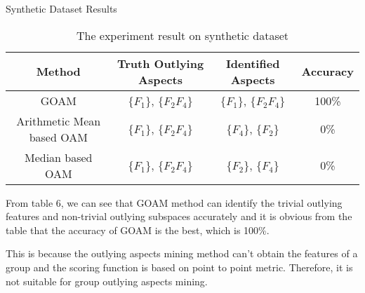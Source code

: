 \documentclass[
 size=14pt,
 paper=smartboard,  %
 mode=present, 		%
 display=slides, 	%
 style=tuliplab,  	%
 pauseslide,
 fleqn,leqno]{powerdot}
\begin{document}
\begin{slide}[toc=,bm=]{Synthetic Dataset Results}

\begin{table}[tb]
\setlength{\abovecaptionskip}{0pt}
\setlength{\belowcaptionskip}{10pt}
\centering
\caption{The experiment result on synthetic dataset}

\begin{tabular}{ c | c | c | c }
\toprule
  Method     &  Truth Outlying Aspects    & Identified Aspects & Accuracy      \\
\midrule
  GOAM       &  $\{F_1\}$, $\{F_2F_4\}$   &  $\{F_1\}$, $\{F_2F_4\}$    & 100\%    \\

Arithmetic Mean based OAM &  $\{F_1\}$, $\{F_2F_4\}$   &  $\{F_4\}$, $\{F_2\}$    &  0\% \\

Median based OAM &  $\{F_1\}$, $\{F_2F_4\}$   &  $\{F_2\}$, $\{F_4\}$    &           0\% \\
\bottomrule
\end{tabular}
\end{table}

\begin{note}
From table $6$,
we can see that GOAM method can identify the trivial outlying features
and non-trivial outlying subspaces accurately and
it is obvious from the table that the accuracy of GOAM is the best,
which is 100\%.

This is because the outlying aspects mining method
can't obtain the features of a group and the scoring function
is based on point to point metric.
Therefore,
it is not suitable for group outlying aspects mining.
\end{note}

\end{slide}
\end{document}
